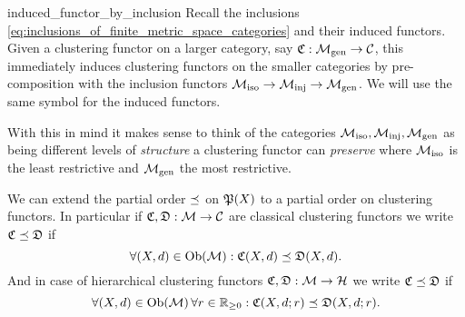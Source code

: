 \begin{myremark}{}{induced_functor_by_inclusion}
Recall the inclusions \eqref{eq:inclusions_of_finite_metric_space_categories} and their induced functors.
Given a clustering functor on a larger category, say $\Cf: \gen \to \C$, this immediately induces clustering functors on the smaller categories by pre-composition with the inclusion functors $\iso \to \inj \to \gen$. We will use the same symbol for the induced functors.
\end{myremark}

With this in mind it makes sense to think of the categories $\iso, \inj, \gen$ as being different levels of \emph{structure} a clustering functor can \emph{preserve} where $\iso$ is the least restrictive and $\gen$ the most restrictive.


\begin{myremark}{}{}
We can extend the partial order $\refines$ on $\P(X)$ to a partial order on clustering functors.
In particular if $\Cf, \mathfrak{D}: \M \to \C$ are classical clustering functors we write $\Cf \refines \mathfrak{D}$ if
\begin{equation*}
    \forall (X,d) \in \ob(\M): \Cf(X,d) \refines \mathfrak{D}(X,d).
\end{equation*}
And in case of hierarchical clustering functors $\Cf, \mathfrak{D}: \M \to \H$ we write $\Cf \refines \mathfrak{D}$ if
\begin{equation*}
    \forall (X,d) \in \ob(\M) \, \forall r \in \R_{\geq0}: \Cf(X,d;r) \refines \mathfrak{D}(X,d;r).
\end{equation*}
\end{myremark}